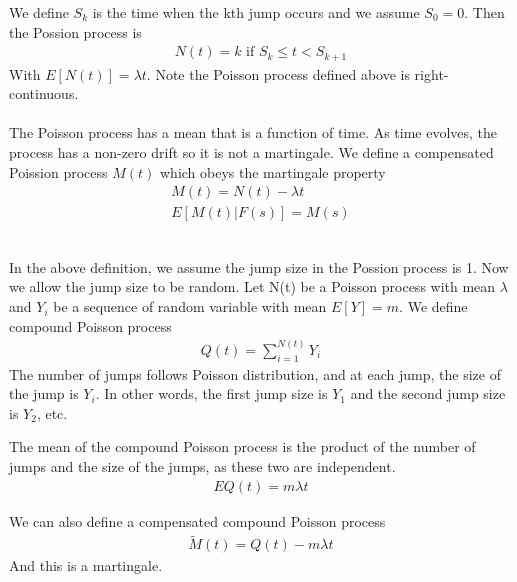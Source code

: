 \documentclass[a4paper]{article}
\begin{document}
We define $S_k$ is the time when the kth jump occurs and we assume $S_0 = 0$. Then the Possion process is
\begin{align*}
	N(t) = k  \text{ if } S_k \leq t < S_{k+1}
\end{align*}
With $E[N(t)] = \lambda t$.
Note the Poisson process defined above is right-continuous.\\

\\
The Poisson process has a mean that is a function of time. As time evolves, the process has a non-zero drift so it is not a martingale. We define a compensated Poission process $M(t)$ which obeys the martingale property
\begin{align*}
	M(t) = N(t) - \lambda t \\
	E[M(t)|F(s)] = M(s)
\end{align*}

\\
In the above definition, we assume the jump size in the Possion process is 1. Now we allow the jump size to be random. Let N(t) be a Poisson process with mean $\lambda$ and $Y_i$ be a sequence of random variable with mean $E[Y] = m$. We define compound Poisson process
\begin{align*}
	Q(t) = \sum_{i=1}^{N(t)} Y_i
\end{align*}
The number of jumps follows Poisson distribution, and at each jump, the size of the jump is $Y_i$. In other words, the first jump size is $Y_1$ and the second jump size is $Y_2$, etc.

The mean of the compound Poisson process is the product of the number of jumps and the size of the jumps, as these two are independent.
\begin{align*}
	EQ(t) = m \lambda t
\end{align*}

We can also define a compensated compound Poisson process
\begin{align*}
	\tilde M(t) = Q(t) - m \lambda t
\end{align*}
And this is a martingale.\\
\end{document}
